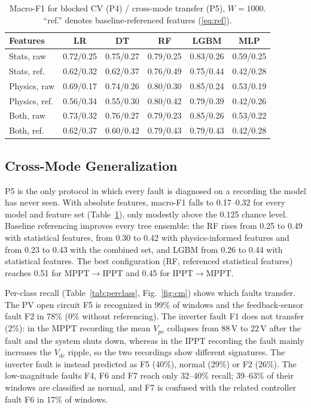 \documentclass[conference]{IEEEtran}
\begin{document}
\begin{table}[t]
\caption{Macro-F1 for blocked CV (P4) / cross-mode transfer (P5), $W=1000$. ``ref.'' denotes baseline-referenced features (\ref{eq:ref}).}
\label{tab:main}
\centering
\footnotesize
\setlength{\tabcolsep}{2.4pt}
\begin{tabular}{@{}lccccc@{}}
\toprule
Features & LR & DT & RF & LGBM & MLP \\
\midrule
Stats, raw & 0.72/0.25 & 0.75/0.27 & 0.79/0.25 & 0.83/0.26 & 0.59/0.25 \\
Stats, ref. & 0.62/0.32 & 0.62/0.37 & 0.76/0.49 & 0.75/0.44 & 0.42/0.28 \\
Physics, raw & 0.69/0.17 & 0.74/0.26 & 0.80/0.30 & 0.85/0.24 & 0.53/0.19 \\
Physics, ref. & 0.56/0.34 & 0.55/0.30 & 0.80/0.42 & 0.79/0.39 & 0.42/0.26 \\
Both, raw & 0.73/0.32 & 0.76/0.27 & 0.79/0.23 & 0.85/0.26 & 0.53/0.22 \\
Both, ref. & 0.62/0.37 & 0.60/0.42 & 0.79/0.43 & 0.79/0.43 & 0.42/0.28 \\
\bottomrule
\end{tabular}
\end{table}

\subsection{Cross-Mode Generalization}
P5 is the only protocol in which every fault is diagnosed on a recording the model has never seen. With absolute features, macro-F1 falls to 0.17--0.32 for every model and feature set (Table~\ref{tab:main}), only modestly above the 0.125 chance level. Baseline referencing improves every tree ensemble: the RF rises from 0.25 to 0.49 with statistical features, from 0.30 to 0.42 with physics-informed features and from 0.23 to 0.43 with the combined set, and LGBM from 0.26 to 0.44 with statistical features. The best configuration (RF, referenced statistical features) reaches 0.51 for MPPT$\rightarrow$IPPT and 0.45 for IPPT$\rightarrow$MPPT.

Per-class recall (Table~\ref{tab:perclass}, Fig.~\ref{fig:cm}) shows which faults transfer. The PV open circuit F5 is recognized in 99\% of windows and the feedback-sensor fault F2 in 78\% (0\% without referencing). The inverter fault F1 does not transfer (2\%): in the MPPT recording the mean $V_{pv}$ collapses from 88\,V to 22\,V after the fault and the system shuts down, whereas in the IPPT recording the fault mainly increases the $V_{dc}$ ripple, so the two recordings show different signatures. The inverter fault is instead predicted as F5 (40\%), normal (29\%) or F2 (26\%). The low-magnitude faults F4, F6 and F7 reach only 32--40\% recall; 39--63\% of their windows are classified as normal, and F7 is confused with the related controller fault F6 in 17\% of windows.
\end{document}
